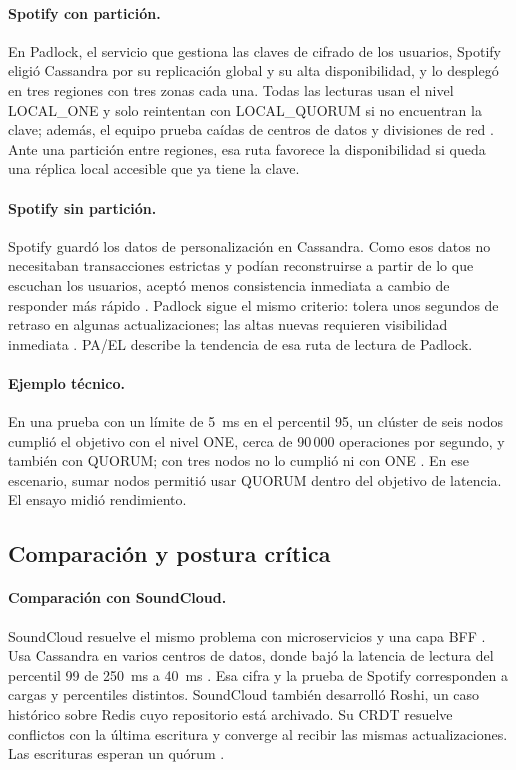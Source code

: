 \paragraph{Spotify con partición.}
En Padlock, el servicio que gestiona las claves de cifrado de los usuarios,
Spotify eligió Cassandra por su replicación global y su alta
disponibilidad, y lo desplegó en tres regiones con tres zonas cada una.
Todas las lecturas usan el nivel LOCAL\_ONE y solo reintentan con
LOCAL\_QUORUM si no encuentran la clave; además, el equipo prueba caídas de
centros de datos y divisiones de red \cite{leenders2018padlock}. Ante una
partición entre regiones, esa ruta favorece la disponibilidad si queda
una réplica local accesible que ya tiene la clave.

\paragraph{Spotify sin partición.}
Spotify guardó los datos de personalización en Cassandra. Como esos datos
no necesitaban transacciones estrictas y podían reconstruirse a partir de lo
que escuchan los usuarios, aceptó menos consistencia inmediata a cambio de
responder más rápido \cite{mishra2015personalization}. Padlock sigue el
mismo criterio: tolera unos segundos de retraso en algunas actualizaciones;
las altas nuevas requieren visibilidad inmediata \cite{leenders2018padlock}.
PA/EL describe la tendencia de esa ruta de lectura de Padlock.

\paragraph{Ejemplo técnico.}
En una prueba con un límite de 5~ms en el percentil 95, un clúster de seis
nodos cumplió el objetivo con el nivel ONE, cerca de 90\,000 operaciones por
segundo, y también con QUORUM; con tres nodos no lo cumplió ni con ONE
\cite{cody2015cassandra}. En ese escenario, sumar nodos permitió usar
QUORUM dentro del objetivo de latencia. El ensayo midió rendimiento.

\subsection*{Comparación y postura crítica}

\paragraph{Comparación con SoundCloud.}
SoundCloud resuelve el mismo problema con microservicios y una capa BFF
\cite{obrien2022strangler}. Usa Cassandra en varios centros de datos, donde
bajó la latencia de lectura del percentil 99 de 250~ms a 40~ms
\cite{pythianSoundcloud}. Esa cifra y la prueba de Spotify corresponden
a cargas y percentiles distintos. SoundCloud también desarrolló Roshi,
un caso histórico sobre Redis cuyo repositorio está archivado. Su CRDT
resuelve conflictos con la última escritura y converge al recibir las mismas
actualizaciones. Las escrituras esperan un quórum
\cite{soundcloudRoshi,almeida2024crdt}.

